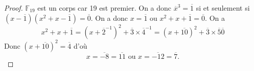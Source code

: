 \documentclass[12pt]{article}
\begin{document}
\begin{proof}
	$\mathbb{F}_{19}$ est un corps car 19 est premier. On a donc $\overline{x}^{3}=\overline{1}$ si et seulement si $(x-\overline{1})(x^{2}+x-\overline{1})=\overline{0}$. On a donc $x=\overline{1}$ ou $x^{2}+x+\overline{1}=\overline{0}$.
	On a 
	\begin{equation}
		x^{2}+x+\overline{1}=(x+\overline{2}^{-1})^{2}+\overline{3}\times\overline{4}^{-1}=(x+\overline{10})^{2}+\overline{3}\times\overline{5}\overline{0}
	\end{equation}
	Donc $(x+\overline{10})^{2}=\overline{4}$ d'où 
	\begin{equation}
		\boxed{x=\overline{-8}=\overline{11}\text{ ou }x=\overline{-12}=\overline{7}.}
	\end{equation}
\end{proof}
\end{document}
